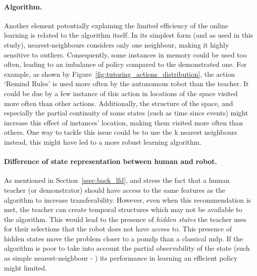 \paragraph{Algorithm.}

Another element potentially explaining the limited efficiency of the online learning is related to the algorithm itself. In its simplest form (and as used in this study), nearest-neighbours considers only one neighbour, making it highly sensitive to outliers. Consequently, some instances in memory could be used too often, leading to an imbalance of policy compared to the demonstrated one. For example, as shown by Figure~\ref{fig:tutoring_actions_distribution}, the action `Remind Rules' is used more often by the autonomous robot than the teacher. It could be due by a few instance of this action in locations of the space visited more often than other actions. Additionally, the structure of the space, and especially the partial continuity of some states (such as time since events) might increase this effect of instances' location, making them visited more often than others. One way to tackle this issue could be to use the k nearest neighbours instead, this might have led to a more robust learning algorithm. 


\paragraph{Difference of state representation between human and robot.}

As mentioned in Section~\ref{ssec:back_lfd}, \cite{knox2014learning} and \cite{sequeira2016discovering} stress the fact that a human teacher (or demonstrator) should have access to the same features as the algorithm to increase transferability. However, even when this recommendation is met, the teacher can create temporal structures which may not be available to the algorithm. This would lead to the presence of \emph{hidden states} the teacher uses for their selections that the robot does not have access to. This presence of hidden states move the problem closer to a \gls{pomdp} than a classical \gls{mdp}. If the algorithm is poor to take into account the partial observability of the state (such as simple nearest-neighbour - \citealt{mccallum1995instance}) its performance in learning an efficient policy might limited.

